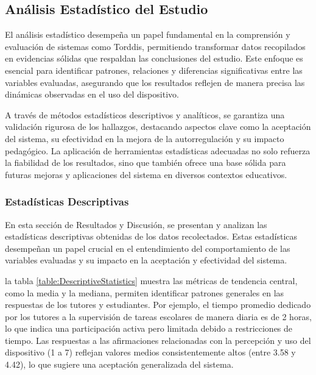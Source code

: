 \documentclass[a4paper,fleqn]{cas-sc}
\begin{document}
		\subsection{Análisis Estadístico del Estudio}
			El análisis estadístico desempeña un papel fundamental en la comprensión y evaluación de sistemas como Torddis, permitiendo transformar datos recopilados en evidencias sólidas que respaldan las conclusiones del estudio. Este enfoque es esencial para identificar patrones, relaciones y diferencias significativas entre las variables evaluadas, asegurando que los resultados reflejen de manera precisa las dinámicas observadas en el uso del dispositivo.
			
			A través de métodos estadísticos descriptivos y analíticos, se garantiza una validación rigurosa de los hallazgos, destacando aspectos clave como la aceptación del sistema, su efectividad en la mejora de la autorregulación y su impacto pedagógico. La aplicación de herramientas estadísticas adecuadas no solo refuerza la fiabilidad de los resultados, sino que también ofrece una base sólida para futuras mejoras y aplicaciones del sistema en diversos contextos educativos.
			
			\subsubsection{Estadísticas Descriptivas}
				En esta sección de Resultados y Discusión, se presentan y analizan las estadísticas descriptivas obtenidas de los datos recolectados. Estas estadísticas desempeñan un papel crucial en el entendimiento del comportamiento de las variables evaluadas y su impacto en la aceptación y efectividad del sistema.
				
				la tabla \ref{table:DescriptiveStatistics} muestra las métricas de tendencia central, como la media y la mediana, permiten identificar patrones generales en las respuestas de los tutores y estudiantes. Por ejemplo, el tiempo promedio dedicado por los tutores a la supervisión de tareas escolares de manera diaria es de 2 horas, lo que indica una participación activa pero limitada debido a restricciones de tiempo. Las respuestas a las afirmaciones relacionadas con la percepción y uso del dispositivo (1 a 7) reflejan valores medios consistentemente altos (entre 3.58 y 4.42), lo que sugiere una aceptación generalizada del sistema.
				
\end{document}
